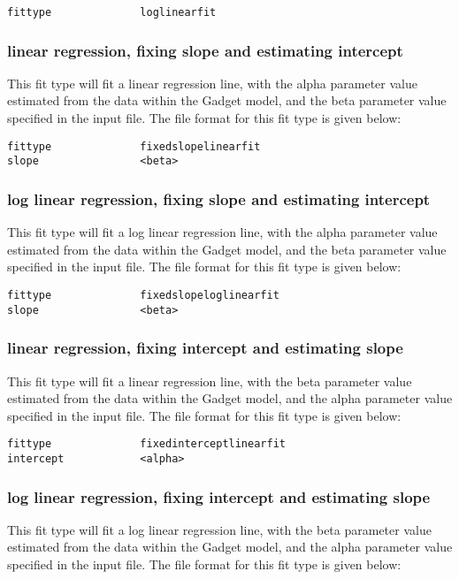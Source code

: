 \documentclass[10pt,twoside]{book}
\begin{document}
{\small\begin{verbatim}
fittype              loglinearfit
\end{verbatim}}

\subsubsection{linear regression, fixing slope and estimating intercept}
This fit type will fit a linear regression line, with the alpha parameter value estimated from the data within the Gadget model, and the beta parameter value specified in the input file.  The file format for this fit type is given below:

{\small\begin{verbatim}
fittype              fixedslopelinearfit
slope                <beta>
\end{verbatim}}

\subsubsection{log linear regression, fixing slope and estimating intercept}
This fit type will fit a log linear regression line, with the alpha parameter value estimated from the data within the Gadget model, and the beta parameter value specified in the input file.  The file format for this fit type is given below:

{\small\begin{verbatim}
fittype              fixedslopeloglinearfit
slope                <beta>
\end{verbatim}}

\subsubsection{linear regression, fixing intercept and estimating slope}
This fit type will fit a linear regression line, with the beta parameter value estimated from the data within the Gadget model, and the alpha parameter value specified in the input file.  The file format for this fit type is given below:

{\small\begin{verbatim}
fittype              fixedinterceptlinearfit
intercept            <alpha>
\end{verbatim}}

\subsubsection{log linear regression, fixing intercept and estimating slope}
This fit type will fit a log linear regression line, with the beta parameter value estimated from the data within the Gadget model, and the alpha parameter value specified in the input file.  The file format for this fit type is given below:
\end{document}

